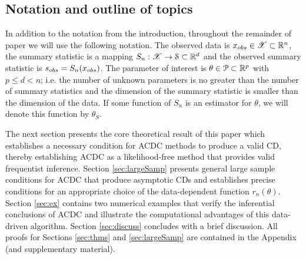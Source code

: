 \subsection{Notation and outline of topics}
In addition to the notation from the introduction, throughout the remainder of paper we will use the following notation. The observed data is $x_{\rm obs} \in \mathscr{X} \subset \mathbb{R}^n$, the summary statistic is a mapping $S_n: \mathscr{X} \rightarrow {\cal S} \subset \mathbb{R}^{d}$ and the observed summary statistic is $s_{\rm obs} = S_n(x_{\rm obs})$. The parameter of interest is $\theta \in \P \subset \mathbb{R}^p$ with $p \leq d < n$; i.e. the number of unknown parameters is no greater than the number of summary statistics and the dimension of the summary statistic is smaller than the dimension of the data. If some function of $S_n$ is an estimator for $\theta$, we will denote this function by $\hat{\theta}_S$. 


The next section presents the core theoretical result of this paper which establishes a necessary condition for ACDC methods to produce a valid CD, thereby establishing ACDC as a likelihood-free method that provides valid frequentist inference. 
Section \ref{sec:largeSamp} presents general large sample conditions for ACDC that produce asymptotic CDs and establishes precise conditions for an appropriate choice of the data-dependent function $r_n(\theta)$. Section \ref{sec:ex} contains two numerical examples that verify the inferential conclusions of ACDC and illustrate the computational advantages of this data-driven algorithm. Section \ref{sec:discuss} concludes with a brief discussion. All proofs for Sections \ref{sec:thms} and \ref{sec:largeSamp} are contained in the Appendix (and supplementary material). 


